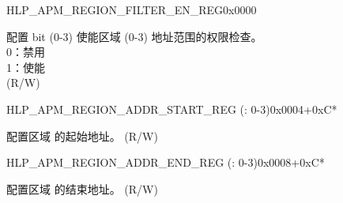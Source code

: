 \begin{register}{H}{LP\_APM\_REGION\_FILTER\_EN\_REG}{0x0000}\label{regdesc:LPAPMREGIONFILTERENREG}
%
%
\regnewline%
\begin{regdesc}\begin{reglist}
\label{fielddesc:LPAPMREGIONFILTEREN}\item [LP\_APM\_REGION\_FILTER\_EN] 配置 bit  (0-3) 使能区域  (0-3) 地址范围的权限检查。\\ 
0：禁用 \\ 
1：使能  \\ (R/W)
\end{reglist}\end{regdesc}
\end{register}


\begin{register}{H}{LP\_APM\_REGION\_ADDR\_START\_REG (: 0-3)}{0x0004+0xC*}\label{regdesc:LPAPMREGIONNADDRSTARTREG}
%
\regnewline%
\begin{regdesc}\begin{reglist}
\label{fielddesc:LPAPMREGIONNADDRSTART}\item [LP\_APM\_REGION\regindex{n}\_ADDR\_START] 配置区域  的起始地址。 (R/W)
\end{reglist}\end{regdesc}
\end{register}


\begin{register}{H}{LP\_APM\_REGION\_ADDR\_END\_REG (: 0-3)}{0x0008+0xC*}\label{regdesc:LPAPMREGIONNADDRENDREG}
%
\regnewline%
\begin{regdesc}\begin{reglist}
\label{fielddesc:LPAPMREGIONNADDREND}\item [LP\_APM\_REGION\regindex{n}\_ADDR\_END] 配置区域  的结束地址。 (R/W)
\end{reglist}\end{regdesc}
\end{register}


